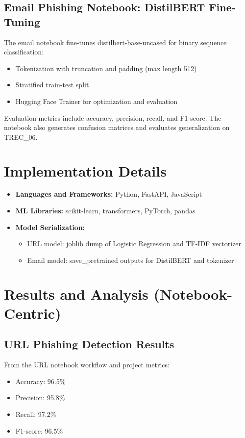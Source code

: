 \documentclass[12pt]{article}
\begin{document}
\subsection{Email Phishing Notebook: DistilBERT Fine-Tuning}
The email notebook fine-tunes distilbert-base-uncased for binary sequence classification:
\begin{itemize}
    \item Tokenization with truncation and padding (max length 512)
    \item Stratified train-test split
    \item Hugging Face Trainer for optimization and evaluation
\end{itemize}
Evaluation metrics include accuracy, precision, recall, and F1-score. The notebook also generates confusion matrices and evaluates generalization on TREC\_06.

\section{Implementation Details}
\begin{itemize}
    \item \textbf{Languages and Frameworks:} Python, FastAPI, JavaScript
    \item \textbf{ML Libraries:} scikit-learn, transformers, PyTorch, pandas
    \item \textbf{Model Serialization:}
    \begin{itemize}
        \item URL model: joblib dump of Logistic Regression and TF-IDF vectorizer
        \item Email model: save\_pretrained outputs for DistilBERT and tokenizer
    \end{itemize}
\end{itemize}

\section{Results and Analysis (Notebook-Centric)}
\subsection{URL Phishing Detection Results}
From the URL notebook workflow and project metrics:
\begin{itemize}
    \item Accuracy: 96.5\%
    \item Precision: 95.8\%
    \item Recall: 97.2\%
    \item F1-score: 96.5\%
\end{itemize}
\end{document}

